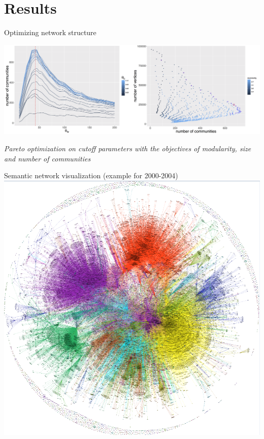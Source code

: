 \documentclass{beamer}
\begin{document}
\section{Results}
\begin{frame}{Optimizing network structure}
    
    
    
    \centering
    \includegraphics[width=\textwidth]{figures/Fig1.png}
    
    \medskip
    
    \textit{Pareto optimization on cutoff parameters with the objectives of modularity, size and number of communities}
    
    \hyperlink{slide:sensitivity}{}
    
\end{frame}

\begin{frame}{Semantic network visualization (example for 2000-2004)}
   \centering
    \includegraphics[height=0.85\textheight]{figures/Fig2.png}
    
\end{frame}
\end{document}
